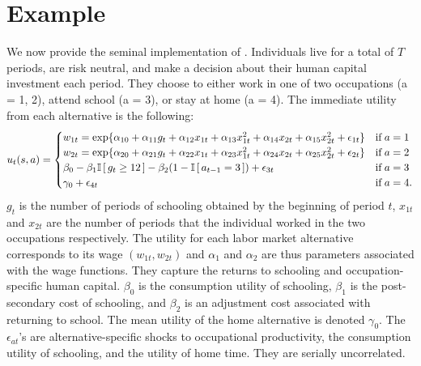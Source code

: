 \section{Example}\label{Example}
We now provide the seminal implementation of \citet{Keane.1994}. Individuals live for a total of $T$ periods, are risk neutral, and make a decision about their human capital investment each period. They choose to either work in one of two occupations (a = 1, 2), attend school (a = 3), or stay at home (a = 4). The immediate utility from each alternative is the following:
%
\begin{align*}
u_t(s, a) = \begin{cases} w_{1t} =
\exp\{\alpha_{10} + \alpha_{11}g_t + \alpha_{12}x_{1t} + \alpha_{13}x^2_{1t} + \alpha_{14}x_{2t} + \alpha_{15}x^2_{2t} + \epsilon_{1t}\} & \text{if}\; a = 1 \\
w_{2t} = \exp\{\alpha_{20} + \alpha_{21}g_t + \alpha_{22}x_{1t} + \alpha_{23}x^2_{1t} + \alpha_{24}x_{2t} + \alpha_{25}x^2_{2t} + \epsilon_{2t}\}& \text{if}\; a = 2 \\
\beta_0 - \beta_1 \mathbb{I}\,[\,g_t \geq 12\,] - \beta_2(1 - \mathbb{I}\,[\,a_{t - 1} = 3\,]) + \epsilon_{3t}& \text{if}\; a = 3 \\
\gamma_0 + \epsilon_{4t}& \text{if}\; a = 4. \\
\end{cases}
\end{align*}
%
$g_t$ is the number of periods of schooling obtained by the beginning of period $t$, $x_{1t}$ and $x_{2t}$ are the number of periods that the individual worked in the two occupations respectively. The utility for each labor market alternative corresponds to its wage $(w_{1t}, w_{2t})$ and $\alpha_{1}$ and $\alpha_{2}$ are thus parameters associated with the wage functions. They capture the returns to schooling and occupation-specific human capital. $\beta_0$ is the consumption utility of schooling, $\beta_1$ is the post-secondary cost of schooling, and $\beta_2$ is an adjustment cost associated with returning to school. The mean utility of the home alternative is denoted $\gamma_0$. The $\epsilon_{at}$'s are alternative-specific shocks to occupational productivity, the consumption utility of schooling, and the utility of home time. They are serially uncorrelated.\\

